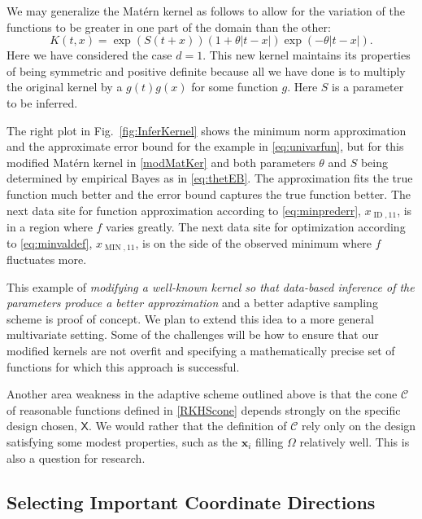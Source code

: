 \documentclass[11pt]{NSFamsart}
\DeclareMathOperator{\MIN}{MIN}
\DeclareMathOperator{\ID}{ID}
\newcommand{\mX}{\mathsf{X}}
\newcommand{\bx}{{\boldsymbol{x}}}
\newcommand{\calc}{{\mathcal{C}}}
\def\abs#1{\ensuremath{\left \lvert #1 \right \rvert}}
\begin{document}
We may generalize the Mat\'ern kernel as follows to allow for the variation of the functions to be greater in one part of the domain than the other:
\begin{equation} \label{modMatKer}
    K(t,x) = \exp(S(t+x))(1 + \theta \abs{t-x}) \exp(-\theta\abs{t-x}).
\end{equation}
Here we have considered the case $d=1$.  This new kernel maintains its properties of being symmetric and positive definite because all we have done is to multiply the original kernel by a $g(t)g(x)$ for some function $g$.  Here $S$ is a parameter to be inferred.

The right plot in Fig.\ \ref{fig:InferKernel} shows the minimum norm approximation and the approximate error bound for the example in \eqref{eq:univarfun}, but for  this modified Mat\'ern kernel in \eqref{modMatKer} and both parameters $\theta$ and $S$ being determined by empirical Bayes as in \eqref{eq:thetEB}.  The approximation fits the true function much better and the error bound captures the true function better.  The next data site for function approximation according to \eqref{eq:minprederr}, $x_{\ID,11}$, is in a region where $f$ varies greatly.  The next data site for optimization according to \eqref{eq:minvaldef}, $x_{\MIN,11}$,  is on the side of the observed minimum where $f$ fluctuates more.

This example of \emph{modifying a well-known kernel so that data-based inference of the parameters produce a better approximation} and a better adaptive sampling scheme is proof of concept.  We plan to extend this idea to a more general multivariate setting.  Some of the challenges will be how to ensure that our modified kernels are not overfit and specifying a mathematically precise set of functions for which this approach is successful.

Another area weakness in the adaptive scheme outlined above is that the cone $\calc$ of reasonable functions defined in  \eqref{RKHScone} depends strongly on the specific design chosen, $\mX$.  We would rather that the definition of $\calc$ rely only on the design satisfying some modest properties, such as the $\bx_i$ filling  $\Omega$ relatively well.  This is also a question for research.

\subsection{Selecting Important Coordinate Directions} \label{sec:selectCoord}
\end{document}
